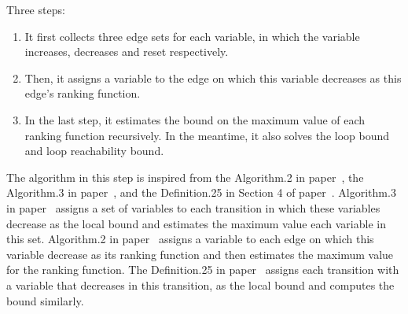 Three steps:
\begin{enumerate}
    \item It first collects three edge sets for each variable,
  in which the variable increases, decreases and reset respectively.
  \item
  Then, it assigns a variable to the edge on which this variable decreases as this edge's ranking function.
  \item
  In the last step, it estimates the bound on the maximum value of each ranking function recursively.
  In the meantime, it also solves the loop bound and loop reachability bound.
  \end{enumerate}

  The algorithm in this step is inspired from the Algorithm.2 in paper~\cite{SinnZV14},
  the Algorithm.3 in paper~\cite{ZulegerGSV11},
  and the Definition.25 in Section 4 of paper~\cite{sinn2017complexity}.
  Algorithm.3 in paper~\cite{ZulegerGSV11} assigns a set of variables to each transition in which these variables decrease as the local bound
  and estimates the maximum value each variable in this set.
  Algorithm.2 in paper~\cite{SinnZV14} assigns a variable to each edge on which this variable decrease as its ranking function
  and then estimates the maximum value for the ranking function.
  The Definition.25 in paper~\cite{sinn2017complexity}
  assigns each transition with a variable that decreases in this transition, as the local bound and computes the bound similarly.
